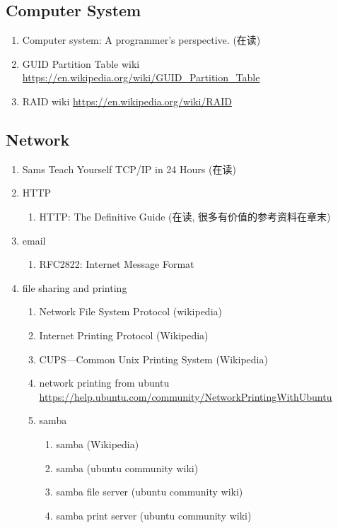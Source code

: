 \documentclass{article}
\begin{document}
\subsection{Computer System}
\begin{enumerate}
    \item Computer system: A programmer's perspective. (在读)
    \item GUID Partition Table wiki \url{https://en.wikipedia.org/wiki/GUID_Partition_Table}
    \item RAID wiki \url{https://en.wikipedia.org/wiki/RAID}
\end{enumerate}
\subsection{Network}
\begin{enumerate}
    \item Sams Teach Yourself TCP/IP in 24 Hours (在读)
    \item HTTP
        \begin{enumerate}
            \item HTTP: The Definitive Guide (在读, 很多有价值的参考资料在章末)
        \end{enumerate}
    \item email
        \begin{enumerate}
            \item RFC2822: Internet Message Format
        \end{enumerate}
    \item file sharing and printing
        \begin{enumerate}
            \item Network File System Protocol (wikipedia)
            \item Internet Printing Protocol (Wikipedia)
            \item CUPS---Common Unix Printing System (Wikipedia)
            \item network printing from ubuntu \url{https://help.ubuntu.com/community/NetworkPrintingWithUbuntu}
            \item samba
                \begin{enumerate}
                    \item samba (Wikipedia)
                    \item samba (ubuntu community wiki)
                    \item samba file server (ubuntu community wiki)
                    \item samba print server (ubuntu community wiki)

\end{enumerate}
\end{enumerate}
\end{enumerate}
\end{document}
